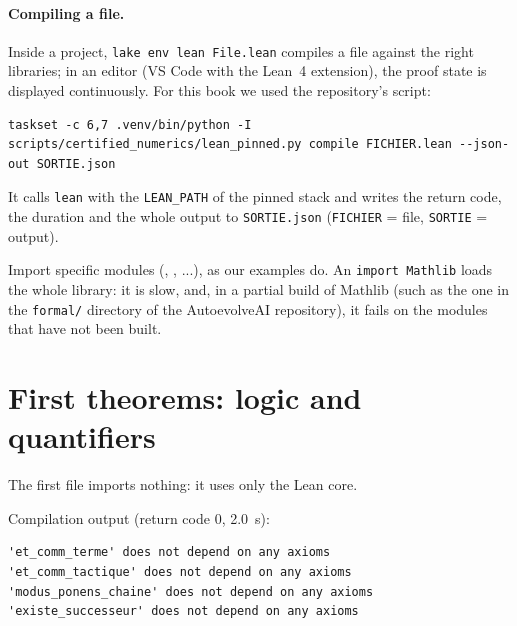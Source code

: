 \paragraph{Compiling a file.} Inside a project, \texttt{lake env lean File.lean} compiles a file against the right
libraries; in an editor (VS Code with the Lean~4 extension), the proof state is displayed continuously. For this book
we used the repository's script:
\begin{lstlisting}[style=appC,language={}]
taskset -c 6,7 .venv/bin/python -I scripts/certified_numerics/lean_pinned.py compile FICHIER.lean --json-out SORTIE.json
\end{lstlisting}
It calls \texttt{lean}  with the \texttt{LEAN\_PATH} of the pinned stack and writes the
return code, the duration and the whole output to \texttt{SORTIE.json} (\texttt{FICHIER} = file, \texttt{SORTIE} =
output).

\begin{warnbox}
Import specific modules (, , ...), as our examples do. An
\texttt{import Mathlib} loads the whole library: it is slow, and, in a partial build of Mathlib (such as the one in the
\texttt{formal/} directory of the AutoevolveAI repository), it fails on the modules that have not been built.
\end{warnbox}

\section{First theorems: logic and quantifiers}\label{appC:sec:logique}

The first file imports nothing: it uses only the Lean core.


\noindent Compilation output (return code $0$, 2.0~s):
\begin{lstlisting}[style=appC,language={}]
'et_comm_terme' does not depend on any axioms
'et_comm_tactique' does not depend on any axioms
'modus_ponens_chaine' does not depend on any axioms
'existe_successeur' does not depend on any axioms
\end{lstlisting}

